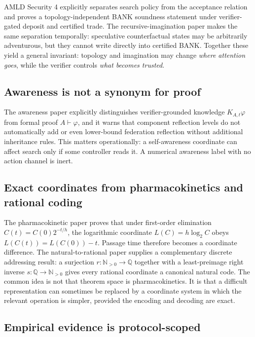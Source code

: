 \documentclass[11pt]{article}
\theoremstyle{special}
\theoremstyle{definition}
\newcommand{\Nat}{\mathbb N}
\newcommand{\Rat}{\mathbb Q}
\begin{document}
AMLD Security 4 explicitly separates search policy from the acceptance relation and proves a topology-independent BANK soundness statement under verifier-gated deposit and certified trade. The recursive-imagination paper makes the same separation temporally: speculative counterfactual states may be arbitrarily adventurous, but they cannot write directly into certified BANK. Together these yield a general invariant: topology and imagination may change \emph{where attention goes}, while the verifier controls \emph{what becomes trusted}.

\subsection{Awareness is not a synonym for proof}

The awareness paper explicitly distinguishes verifier-grounded knowledge $K_{A,t}\varphi$ from formal proof $A\vdash\varphi$, and it warns that component reflection levels do not automatically add or even lower-bound federation reflection without additional inheritance rules. This matters operationally: a self-awareness coordinate can affect search only if some controller reads it. A numerical awareness label with no action channel is inert.

\subsection{Exact coordinates from pharmacokinetics and rational coding}

The pharmacokinetic paper proves that under first-order elimination $C(t)=C(0)2^{-t/h}$, the logarithmic coordinate $L(C)=h\log_2 C$ obeys $L(C(t))=L(C(0))-t$. Passage time therefore becomes a coordinate difference. The natural-to-rational paper supplies a complementary discrete addressing result: a surjection $r:\Nat_{>0}\to\Rat$ together with a least-preimage right inverse $s:\Rat\to\Nat_{>0}$ gives every rational coordinate a canonical natural code. The common idea is not that theorem space is pharmacokinetics. It is that a difficult representation can sometimes be replaced by a coordinate system in which the relevant operation is simpler, provided the encoding and decoding are exact.

\subsection{Empirical evidence is protocol-scoped}
\end{document}
